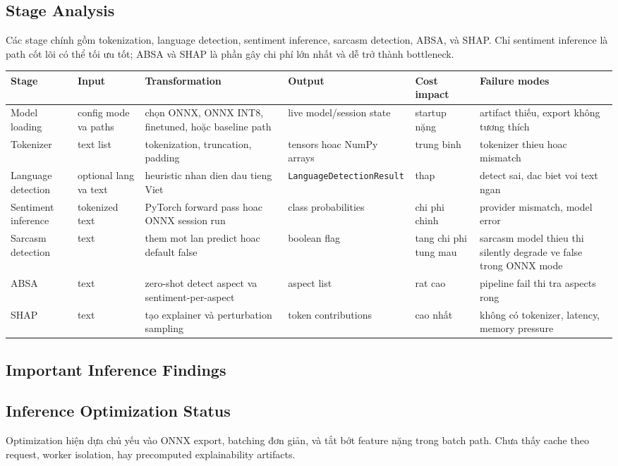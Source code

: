 \subsection{Stage Analysis}
Các stage chính gồm tokenization, language detection, sentiment inference, sarcasm detection, ABSA, và SHAP. Chỉ sentiment inference là path cốt lõi có thể tối ưu tốt; ABSA và SHAP là phần gây chi phí lớn nhất và dễ trở thành bottleneck.

\begin{longtable}{@{}p{}p{}p{}p{}p{}p{}@{}}
\toprule
\textbf{Stage} & \textbf{Input} & \textbf{Transformation} & \textbf{Output} & \textbf{Cost impact} & \textbf{Failure modes} \\
\midrule
\endhead
Model loading & config mode va paths & chọn ONNX, ONNX INT8, finetuned, hoặc baseline path & live model/session state & startup nặng & artifact thiếu, export không tương thích \\
Tokenizer & text list & tokenization, truncation, padding & tensors hoac NumPy arrays & trung binh & tokenizer thieu hoac mismatch \\
Language detection & optional lang va text & heuristic nhan dien dau tieng Viet & \texttt{LanguageDetectionResult} & thap & detect sai, dac biet voi text ngan \\
Sentiment inference & tokenized text & PyTorch forward pass hoac ONNX session run & class probabilities & chi phi chinh & provider mismatch, model error \\
Sarcasm detection & text & them mot lan predict hoac default false & boolean flag & tang chi phi tung mau & sarcasm model thieu thi silently degrade ve false trong ONNX mode \\
ABSA & text & zero-shot detect aspect va sentiment-per-aspect & aspect list & rat cao & pipeline fail thi tra aspects rong \\
SHAP & text & tạo explainer và perturbation sampling & token contributions & cao nhất & không có tokenizer, latency, memory pressure \\
\bottomrule
\end{longtable}

\subsection{Important Inference Findings}
\subsection{Inference Optimization Status}
Optimization hiện dựa chủ yếu vào ONNX export, batching đơn giản, và tắt bớt feature nặng trong batch path. Chưa thấy cache theo request, worker isolation, hay precomputed explainability artifacts.

